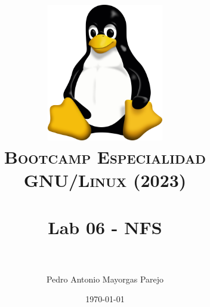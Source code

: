 

\graphicspath{ {img/} }

\title{
\normalfont \normalsize
\includegraphics[width=6cm,height=6cm]{logo}\\
\textsc{\textbf{Bootcamp Especialidad GNU/Linux (2023)}} \\ [25pt] %
\horrule{0.5pt} \\[0.4cm] %
\huge Lab 06 - NFS \\ %
\horrule{2pt} \\[0.5cm] %
}



\author{Pedro Antonio Mayorgas Parejo} %

\date{\normalsize\today} %




\maketitle %

\newpage %

\tableofcontents %

\newpage


